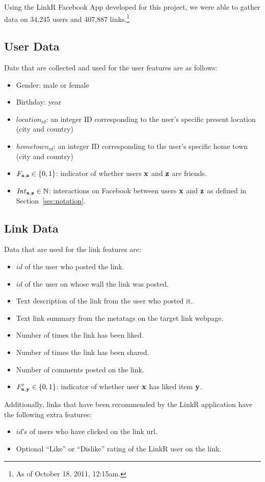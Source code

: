 \label{sec:dataset}

Using the LinkR Facebook App developed for this project, we were able
to gather data on 34,245 users and 407,887 links.\footnote{As of
October 18, 2011, 12:15am.}

\subsection{User Data}

Date that are collected and used for the user features are as follows:
\begin{itemize}
\item {Gender:} male or female
\item {Birthday:} year
\item {$\mathit{location}_\mathit{id}$:} an integer ID corresponding
to the user's specific present location (city and country)
\item {$\mathit{hometown}_\mathit{id}$:} an integer ID corresponding
to the user's specific home town (city and country)
\item {$F_{\mathbf{x},\mathbf{z}} \in \{ 0, 1\}$:} indicator of whether 
users $\mathbf{x}$ and $\mathbf{z}$ are friends.
\item {$\mathit{Int}_{\mathbf{x},\mathbf{z}} \in \mathbb{N}$:} interactions on
Facebook between users $\mathbf{x}$ and $\mathbf{z}$ as defined in Section~\ref{sec:notation}.
\end{itemize}

\subsection{Link Data}

Data that are used for the link features are:
\begin{itemize}
\item{$\mathit{id}$ of the user who posted the link.}
\item{$\mathit{id}$ of the user on whose wall the link was posted.}
\item{Text description of the link from the user who posted it.}
\item{Text link summary from the metatags on the target link webpage.}
\item{Number of times the link has been liked.}
\item{Number of times the link has been shared.}
\item{Number of comments posted on the link}.
\item {$F'_{\mathbf{x},\mathbf{y}} \in \{0, 1\}$:} indicator of whether user $\mathbf{x}$ has liked item $\mathbf{y}$.
\end{itemize}
Additionally, links that have been recommended by the LinkR
application have the following extra features:
\begin{itemize}
\item{$\mathit{id}$'s of users who have clicked on the link url.}
\item{Optional ``Like'' or ``Dislike'' rating of the LinkR user on the link.}
\end{itemize}

